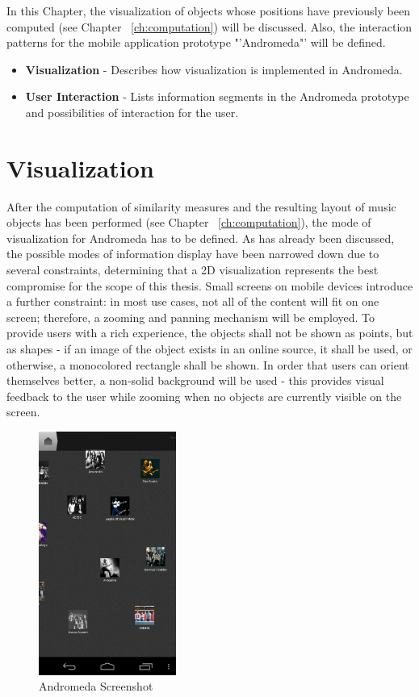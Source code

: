 In this Chapter, the visualization of objects whose positions have previously been computed (see Chapter ~\ref{ch:computation}) will be discussed. Also, the interaction patterns for the mobile application prototype "'Andromeda"' will be defined.

\begin{itemize}
	\item \textbf {Visualization} - Describes how visualization is implemented in Andromeda.
	\item \textbf {User Interaction} - Lists information segments in the Andromeda prototype and possibilities of interaction for the user.
\end{itemize}

\section{Visualization}

After the computation of similarity measures and the resulting layout of music objects has been performed (see Chapter ~\ref{ch:computation}), the mode of visualization for Andromeda has to be defined. As has already been discussed, the possible modes of information display have been narrowed down due to several constraints, determining that a 2D visualization represents the best compromise for the scope of this thesis. Small screens on mobile devices introduce a further constraint: in most use cases, not all of the content will fit on one screen; therefore, a zooming and panning mechanism will be employed. To provide users with a rich experience, the objects shall not be shown as points, but as shapes - if an image of the object exists in an online source, it shall be used, or otherwise, a monocolored rectangle shall be shown. In order that users can orient themselves better, a non-solid background will be used - this provides visual feedback to the user while zooming when no objects are currently visible on the screen.

\begin{figure}[H]
  \centering
    \includegraphics[width=0.4\textwidth]{figures/screen_mds_10_after_all_uncollided_nodes}
  \caption{Andromeda Screenshot}
  \label{fig:prototype_screenshot}
\end{figure}

